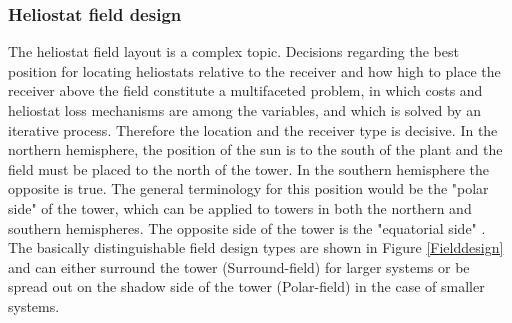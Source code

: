 \subsubsection{Heliostat field design}
The heliostat field layout is a complex topic. Decisions regarding the best position for locating heliostats relative to the receiver and how high to place the receiver above the field constitute a multifaceted problem, in which costs and heliostat loss mechanisms are among the variables, and which is solved by an iterative process. Therefore the location and the receiver type is decisive. In the northern hemisphere, the position of the sun is to the south of the plant and the field must be placed to the north of the tower. In the southern hemisphere the opposite is true. The general terminology for this position would be the "polar side" of the tower, which can be applied to towers in both the northern and southern hemispheres. The opposite side of the tower is the
"equatorial side" \cite{Alexopoulos2013}. The basically distinguishable field design types are shown in Figure \ref{Fielddesign} and can either surround the tower (Surround-field) for larger systems or be spread out on the shadow side of the tower (Polar-field) in the case of smaller systems.

